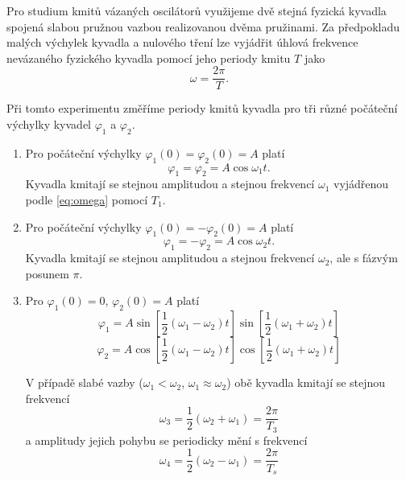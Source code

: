 \documentclass[protokol.tex]{subfiles}
\begin{document}
Pro studium kmitů vázaných oscilátorů využijeme dvě stejná fyzická kyvadla spojená slabou pružnou vazbou realizovanou dvěma pružinami. Za předpokladu malých výchylek kyvadla a nulového tření lze vyjádřit úhlová frekvence nevázaného fyzického kyvadla pomocí jeho periody kmitu $T$ jako
\begin{equation} \label{eq:omega}
\omega = \frac{2 \pi}{T}.
\end{equation}

Při tomto experimentu změříme periody kmitů kyvadla pro tři různé počáteční výchylky kyvadel $\varphi_1$ a $\varphi_2$. 
\begin{enumerate}
\item Pro počáteční výchylky $\varphi_1 (0) = \varphi_2 (0) = A$ platí \cite{stud_text}
\begin{equation} \label{eq:phi_1}
\varphi_1 = \varphi_2 = A \cos \omega_1 t.
\end{equation}
Kyvadla kmitají se stejnou amplitudou a stejnou frekvencí $\omega_1$ vyjádřenou podle \eqref{eq:omega} pomocí $T_1$.

\item Pro počáteční výchylky $\varphi_1 (0) = -\varphi_2 (0) = A$ platí \cite{stud_text}
\begin{equation} \label{eq:phi_2}
\varphi_1 = -\varphi_2 = A \cos \omega_2 t.
\end{equation}
Kyvadla kmitají se stejnou amplitudou a stejnou frekvencí $\omega_2$, ale s fázvým posunem $\pi$.

\newpage

\item Pro $\varphi_1 (0) = 0$, $\varphi_2 (0) = A$ platí \cite{stud_text}
\begin{equation} \label{eq:phi_3_1}
\varphi_1 = A 
	\sin \left[ \frac{1}{2} (\omega_1 - \omega_2) t \right] 	
	\sin \left[ \frac{1}{2} (\omega_1 + \omega_2) t \right]
\end{equation}
\begin{equation} \label{eq:phi_3_2}
\varphi_2 = A 
	\cos \left[ \frac{1}{2} (\omega_1 - \omega_2) t \right] 	
	\cos \left[ \frac{1}{2} (\omega_1 + \omega_2) t \right]
\end{equation}

V případě slabé vazby ($\omega_1 < \omega_2$, $\omega_1 \approx \omega_2$) obě kyvadla kmitají se stejnou frekvencí \cite{stud_text}
\begin{equation} \label{eq:omega_3}
\omega_3 = \frac{1}{2} (\omega_2 + \omega_1) = \frac{2 \pi}{T_3}
\end{equation}
a amplitudy jejich pohybu se periodicky mění s frekvencí \cite{stud_text}
\begin{equation} \label{eq:omega_4}
\omega_4 = \frac{1}{2} (\omega_2 - \omega_1) = \frac{2 \pi}{T_s}
\end{equation}
\end{enumerate}
\end{document}
